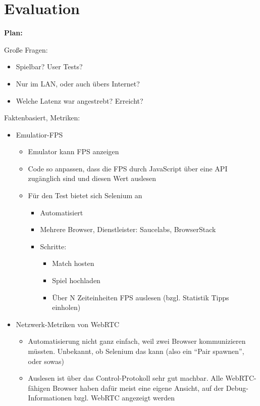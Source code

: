 \chapter{Evaluation}\label{evaluation}

\blindtext[1]

\newpage

\textbf{Plan:}

Große Fragen:

\begin{itemize}
\tightlist
\item
  Spielbar? User Tests?
\item
  Nur im LAN, oder auch übers Internet?
\item
  Welche Latenz war angestrebt? Erreicht?
\end{itemize}

Faktenbasiert, Metriken:

\begin{itemize}
\tightlist
\item
  Emulatior-FPS

  \begin{itemize}
  \tightlist
  \item
    Emulator kann FPS anzeigen
  \item
    Code so anpassen, dass die FPS durch JavaScript über eine API
    zugänglich sind und diesen Wert auslesen
  \item
    Für den Test bietet sich Selenium an

    \begin{itemize}
    \tightlist
    \item
      Automatisiert
    \item
      Mehrere Browser, Dienstleister: Saucelabs, BrowserStack
    \item
      Schritte:

      \begin{itemize}
      \tightlist
      \item
        Match hosten
      \item
        Spiel hochladen
      \item
        Über N Zeiteinheiten FPS auslesen (bzgl. Statistik Tipps
        einholen)
      \end{itemize}
    \end{itemize}
  \end{itemize}
\item
  Netzwerk-Metriken von WebRTC

  \begin{itemize}
  \tightlist
  \item
    Automatisierung nicht ganz einfach, weil zwei Browser kommunizieren
    müssten. Unbekannt, ob Selenium das kann (also ein ``Pair spawnen'',
    oder sowas)
  \item
    Auslesen ist über das Control-Protokoll sehr gut machbar. Alle
    WebRTC-fähigen Browser haben dafür meist eine eigene Ansicht, auf
    der Debug-Informationen bzgl. WebRTC angezeigt werden
  \end{itemize}
\end{itemize}

